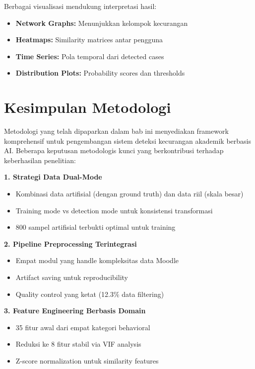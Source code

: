 Berbagai visualisasi mendukung interpretasi hasil:

\begin{itemize}
    \item \textbf{Network Graphs:} Menunjukkan kelompok kecurangan
    \item \textbf{Heatmaps:} Similarity matrices antar pengguna
    \item \textbf{Time Series:} Pola temporal dari detected cases
    \item \textbf{Distribution Plots:} Probability scores dan thresholds
\end{itemize}

\section{Kesimpulan Metodologi}
\label{sec:kesimpulanBab3}

Metodologi yang telah dipaparkan dalam bab ini menyediakan framework komprehensif untuk pengembangan sistem deteksi kecurangan akademik berbasis AI. Beberapa keputusan metodologis kunci yang berkontribusi terhadap keberhasilan penelitian:

\textbf{1. Strategi Data Dual-Mode}
\begin{itemize}
    \item Kombinasi data artifisial (dengan ground truth) dan data riil (skala besar)
    \item Training mode vs detection mode untuk konsistensi transformasi
    \item 800 sampel artifisial terbukti optimal untuk training
\end{itemize}

\textbf{2. Pipeline Preprocessing Terintegrasi}
\begin{itemize}
    \item Empat modul yang handle kompleksitas data Moodle
    \item Artifact saving untuk reproducibility
    \item Quality control yang ketat (12.3\% data filtering)
\end{itemize}

\textbf{3. Feature Engineering Berbasis Domain}
\begin{itemize}
    \item 35 fitur awal dari empat kategori behavioral
    \item Reduksi ke 8 fitur stabil via VIF analysis
    \item Z-score normalization untuk similarity features
\end{itemize}

